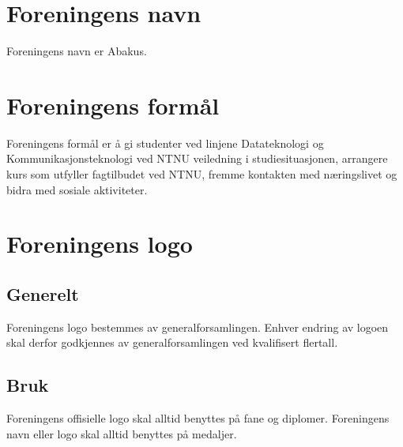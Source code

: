 \section{Foreningens navn}
Foreningens navn er Abakus.

\section{Foreningens formål}
Foreningens formål er å gi studenter ved linjene Datateknologi og
Kommunikasjonsteknologi ved NTNU veiledning i studiesituasjonen, arrangere
kurs som utfyller fagtilbudet ved NTNU, fremme kontakten med næringslivet og
bidra med sosiale aktiviteter.

\section{Foreningens logo}

\subsection{Generelt}
Foreningens logo bestemmes av generalforsamlingen. Enhver endring av logoen
skal derfor godkjennes av generalforsamlingen ved kvalifisert flertall.

\subsection{Bruk}
Foreningens offisielle logo skal alltid benyttes på fane og diplomer.
Foreningens navn eller logo skal alltid benyttes på medaljer. 

